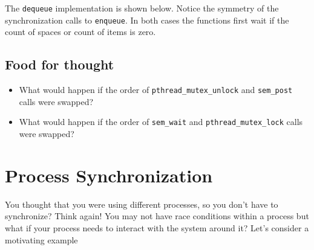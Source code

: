 The \texttt{dequeue} implementation is shown below. Notice the symmetry
of the synchronization calls to \texttt{enqueue}. In both cases the
functions first wait if the count of spaces or count of items is zero.

\begin{Shaded}
\begin{Highlighting}[]
 

   \NormalTok{*result = b[(out++) & (N}\NormalTok{)]}


   
\NormalTok{\}}
\end{Highlighting}
\end{Shaded}

\subsection{Food for thought}\label{food-for-thought}

\begin{itemize}
\tightlist
\item
  What would happen if the order of \texttt{pthread\_mutex\_unlock} and
  \texttt{sem\_post} calls were swapped?
\item
  What would happen if the order of \texttt{sem\_wait} and
  \texttt{pthread\_mutex\_lock} calls were swapped?
\end{itemize}

\section{Process Synchronization}\label{process-synchronization}

You thought that you were using different processes, so you don't have
to synchronize? Think again! You may not have race conditions within a
process but what if your process needs to interact with the system
around it? Let's consider a motivating example

\begin{Shaded}
\begin{Highlighting}[]
   
     
\NormalTok{\}}

 
        \NormalTok{);}
    \NormalTok{\} } \NormalTok{\{}
        \NormalTok{);}
    \NormalTok{\}}
     \NormalTok{;}
\NormalTok{\}}
\end{Highlighting}
\end{Shaded}


